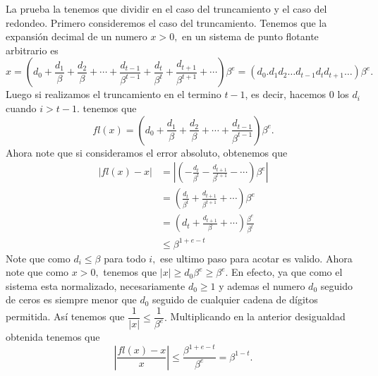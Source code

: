 \documentclass[12pt, a4paper]{article}%
\begin{document}
\begin{sproof}
    La prueba la tenemos que dividir en el caso del truncamiento y el caso del redondeo. Primero consideremos el caso del truncamiento. Tenemos que la expansión decimal de un numero $x>0,$ en un sistema de punto flotante arbitrario es
    $$x=\left(d_0+\frac{d_1}{\beta}+\frac{d_2}{\beta}+\cdots+\frac{d_{t-1}}{\beta^{t-1}}+\frac{d_t}{\beta^{t}}+\frac{d_{t+1}}{\beta^{t+1}}+\cdots\right)\beta^e=(d_0.d_1d_2\dots d_{t-1}d_{t}d_{t+1}\dots)\beta^e.$$
    Luego si realizamos el truncamiento en el termino $t-1$, es decir, hacemos $0$ los $d_i$ cuando $i>t-1.$ tenemos que
    $$fl(x)=\left(d_0+\frac{d_1}{\beta}+\frac{d_2}{\beta}+\cdots+\frac{d_{t-1}}{\beta^{t-1}}\right)\beta^e.$$
    Ahora note que si consideramos el error absoluto, obtenemos que
    \begin{align*}
        |fl(x)-x|&=\left|\left(-\frac{d_t}{\beta^{t}}-\frac{d_{t+1}}{\beta^{t+1}}-\cdots\right)\beta^e\right|\\
        &=\left(\frac{d_t}{\beta^{t}}+\frac{d_{t+1}}{\beta^{t+1}}+\cdots\right)\beta^e\\
        &=\left(d_t+\frac{d_{t+1}}{\beta}+\cdots\right)\frac{\beta^e}{\beta^t}\\
        &\leq \beta^{1+e-t}
    \end{align*}
    Note que como $d_i\leq \beta$ para todo $i,$ ese ultimo paso para acotar es valido. Ahora note que como $x>0,$ tenemos que $|x|\geq d_0\beta^e\geq \beta^e.$ En efecto, ya que como el sistema esta normalizado, necesariamente $d_0\geq 1$ y ademas el numero $d_0$ seguido de ceros es siempre menor que $d_0$ seguido de cualquier cadena de dígitos permitida. Así tenemos que $\dfrac{1}{|x|}\leq \dfrac{1}{\beta^e}.$ Multiplicando en la anterior desigualdad obtenida tenemos que
    $$\left|\frac{fl(x)-x}{x}\right|\leq \frac{\beta^{1+e-t}}{\beta^e}=\beta^{1-t}.$$


\end{sproof}
\end{document}
